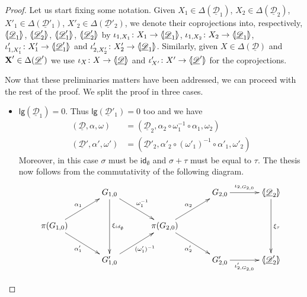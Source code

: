 \documentclass[a4paper,UKenglish,cleveref,pdftex,thm-restate,numberwithinsect]{lipics-v2021}
\newcommand{\id}[1]{\mathsf{id}_{#1}}
\def\X{\textbf {\textup{X}}}
\newcommand{\dder}[1]{\mathscr{#1}}
\newcommand{\der}[1]{\underline{\dder{#1}}}
\newcommand{\lpro}{\langle \hspace{-1.85pt}[}
\newcommand{\rpro}{]\hspace{-1.85pt}\rangle}
\newcommand{\tpro}[1]{\lpro \der{#1}\rpro}
\newcommand{\lgh}[0]{\mathsf{lg}}
\begin{document}
\begin{proof}
  Let us start fixing some notation. Given $X_1\in \Delta(\der{D}_1)$,
  $X_2\in \Delta(\der{D}_2)$, $X'_1\in \Delta(\der{D}'_1)$,
  $X'_2\in \Delta(\der{D}'_2)$, we denote their coprojections
  into, respectively, $\lpro \der{D}_1\rpro$, $\lpro \der{D}'_2\rpro$,
  $\lpro \der{D}'_1\rpro$, $\lpro \der{D}'_2\rpro$ by
  $\iota_{1, X_1}\colon X_1\to \lpro\der{D}_1\rpro$,
  $\iota_{1, X_2}\colon X_2\to \lpro\der{D}_1\rpro$,
  $\iota'_{1, X'_1}\colon X'_1\to \lpro\der{D}'_1\rpro$ and
  $\iota'_{2, X'_2}\colon X'_2\to \lpro\der{D}_1\rpro$. Similarly,
  given $X\in \Delta(\der{D})$ and $\X'\in \Delta(\der{D}')$ we
  use $\iota_X\colon X\to \tpro{D}$ and
  $\iota'_{X'}\colon X'\to \lpro \der{D}' \rpro$ for the
  coprojections.

  Now that these preliminaries matters have been addressed, we can proceed with the rest of the proof. We split the proof in three cases.
  \begin{itemize}
  \item $\lgh(\der{D}_1)=0$. Thus $\lgh(\der{D}'_1)=0$ too  and we have
    \begin{align*}
      (\der{D}, \alpha, \omega) & =(\der{D}_2, \alpha_2\circ \omega_1^{-1}\circ \alpha_1, \omega_2) \\ (\der{D}', \alpha', \omega')&=(\der{D}'_2, \alpha'_2\circ (\omega'_1)^{-1}\circ \alpha'_1, \omega'_2)
    \end{align*}
    Moreover, in this case $\sigma$ must be $\id{\emptyset}$ and $\sigma+\tau$ must be equal to $\tau$. The thesis now follows from the commutativity of the following diagram.
    \[\xymatrix@C=35pt{& G_{1,0}\ar[dd]^{\xi_{\id{\emptyset}}} \ar[dr]^{\omega^{-1}_1}&&G_{2,0}\ar[r]^-{\iota_{2, G_{2,0}}} & \lpro \der{D}_2\rpro \ar[dd]^{\xi_{\tau}}\\\pi(G_{1,0})  \ar[ur]^{\alpha_1} \ar[dr]_{\alpha'_1}&& \pi(G_{2,0}) \ar[ur]^{\alpha_2} \ar[dr]_{\alpha'_2}\\& G'_{1,0} \ar[ur]_{(\omega'_1)^{-1}}&&G'_{2,0} \ar[r]_-{\iota'_{2, G_{2,0}}}& \lpro \der{D}'_2\rpro}\]


\end{itemize}
\end{proof}
\end{document}
